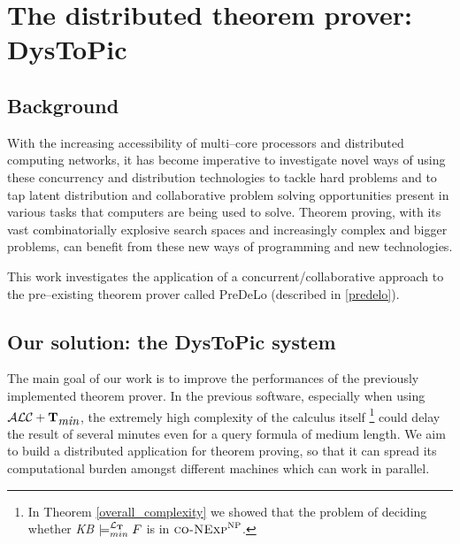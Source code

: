 \documentclass[a4paper, 11pt, oneside]{duthesis}
\newcommand{\tip}{{\bf T}}
\newcommand{\alctmin}{\mathcal{ALC}+\tip_{\mbox{\em min}}}
\newcommand{\ellet} {\mathcal{L}_{\bf T}}
\begin{document}
\newpage


\chapter{The distributed theorem prover: DysToPic}\label{chap_dystopic}
\section{Background}\label{bg}
With the increasing accessibility of multi--core processors and distributed computing networks, it has become imperative to investigate novel ways of using these concurrency and distribution technologies to tackle hard problems and to tap latent distribution and collaborative problem solving opportunities present in various tasks that computers are being used to solve.
Theorem proving, with its vast combinatorially explosive search spaces and increasingly complex and bigger problems, can benefit from these new ways of programming and new technologies\cite{conf/ieeehpcs/SripriyaBS09}.


This work investigates the application of a concurrent/collaborative approach to the pre--existing theorem prover called PreDeLo (described in \ref{predelo}).




\section{Our solution: the DysToPic system}



The main goal of our work is to improve the performances of the previously implemented theorem prover.
In the previous software, especially when using $\alctmin$, the extremely high complexity of the calculus itself
\footnote{In Theorem \ref{overall_complexity} we showed that the problem of deciding whether \emph{KB} $\models_{min}^{\ellet} F$ is in $\textsc{co-NExp}^\textsc{NP}$.}
could delay the result of several minutes even for a query formula of medium length.
We aim to build a distributed application for theorem proving, so that it can spread its computational burden amongst different machines which can work in parallel.
\end{document}
